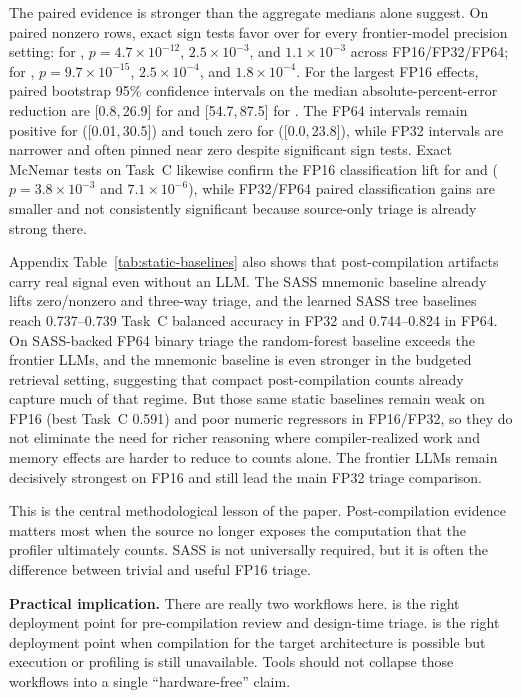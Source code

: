 The paired evidence is stronger than the aggregate medians alone suggest.
On paired nonzero rows, exact sign tests favor \sourcesass over \sourceonly for every frontier-model precision setting:
for \gptfivefour, $p=4.7\times 10^{-12}$, $2.5\times 10^{-3}$, and $1.1\times 10^{-3}$ across FP16/FP32/FP64;
for \opus, $p=9.7\times 10^{-15}$, $2.5\times 10^{-4}$, and $1.8\times 10^{-4}$.
For the largest FP16 effects, paired bootstrap 95\% confidence intervals on the median absolute-percent-error reduction are [0.8,\,26.9] for \gptfivefour and [54.7,\,87.5] for \opus.
The FP64 intervals remain positive for \opus ([0.01,\,30.5]) and touch zero for \gptfivefour ([0.0,\,23.8]), while FP32 intervals are narrower and often pinned near zero despite significant sign tests.
Exact McNemar tests on Task~C likewise confirm the FP16 classification lift for \gptfivefour and \opus ($p=3.8\times 10^{-3}$ and $7.1\times 10^{-6}$), while FP32/FP64 paired classification gains are smaller and not consistently significant because source-only triage is already strong there.

Appendix Table~\ref{tab:static-baselines} also shows that post-compilation artifacts carry real signal even without an LLM.
The SASS mnemonic baseline already lifts zero/nonzero and three-way triage, and the learned SASS tree baselines reach 0.737--0.739 Task~C balanced accuracy in FP32 and 0.744--0.824 in FP64.
On SASS-backed FP64 binary triage the random-forest baseline exceeds the frontier LLMs, and the mnemonic baseline is even stronger in the budgeted retrieval setting, suggesting that compact post-compilation counts already capture much of that regime.
But those same static baselines remain weak on FP16 (best Task~C 0.591) and poor numeric regressors in FP16/FP32, so they do not eliminate the need for richer reasoning where compiler-realized work and memory effects are harder to reduce to counts alone.
The frontier LLMs remain decisively strongest on \sourcesass FP16 and still lead the main FP32 triage comparison.

This is the central methodological lesson of the paper.
Post-compilation evidence matters most when the source no longer exposes the computation that the profiler ultimately counts.
SASS is not universally required, but it is often the difference between trivial and useful FP16 triage.

\textbf{Practical implication.}
There are really two workflows here.
\sourceonly is the right deployment point for pre-compilation review and design-time triage.
\sourcesass is the right deployment point when compilation for the target architecture is possible but execution or profiling is still unavailable.
Tools should not collapse those workflows into a single ``hardware-free'' claim.

